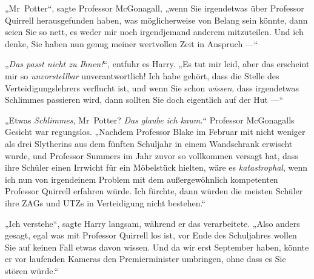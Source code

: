 „Mr~Potter“, sagte Professor McGonagall, „wenn Sie irgendetwas über Professor Quirrell herausgefunden haben, was möglicherweise von Belang sein könnte, dann seien Sie so nett, es weder mir noch irgendjemand anderem mitzuteilen. Und ich denke, Sie haben nun genug meiner wertvollen Zeit in Anspruch —“

„\emph{Das passt nicht zu Ihnen!}“, entfuhr es Harry.
„Es tut mir leid, aber das erscheint mir so \emph{unvorstellbar} unverantwortlich! Ich habe gehört, dass die Stelle des Verteidigungslehrers verflucht ist, und wenn Sie schon \emph{wissen}, dass irgendetwas Schlimmes passieren wird, dann sollten Sie doch eigentlich auf der Hut —“

„Etwas \emph{Schlimmes}, Mr~Potter? \emph{Das glaube ich kaum.}“ Professor McGonagalls Gesicht war regungslos.
„Nachdem Professor Blake im Februar mit nicht weniger als drei Slytherins aus dem fünften Schuljahr in einem Wandschrank erwischt wurde, und Professor Summers im Jahr zuvor so vollkommen versagt hat, dass ihre Schüler einen Irrwicht für ein Möbelstück hielten, wäre es \emph{katastrophal}, wenn ich nun von irgendeinem Problem mit dem außergewöhnlich kompetenten Professor Quirrell erfahren würde. Ich fürchte, dann würden die meisten Schüler ihre ZAGs und UTZs in Verteidigung nicht bestehen.“

„Ich verstehe“, sagte Harry langsam, während er das verarbeitete.
„Also anders gesagt, egal was mit Professor Quirrell los ist, vor Ende des Schuljahres wollen Sie auf keinen Fall etwas davon wissen. Und da wir erst September haben, könnte er vor laufenden Kameras den Premierminister umbringen, ohne dass es Sie stören würde.“


